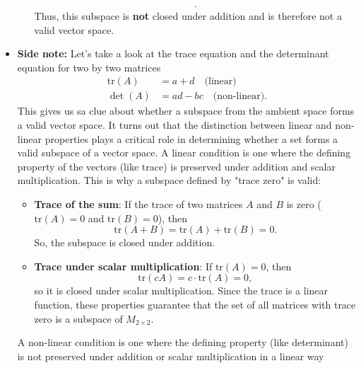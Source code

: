 \documentclass{report}
\begin{document}
\begin{itemize}
\begin{enumerate}
\begin{align*}
                    .\end{align*}
                    Thus, this subspace is \textbf{not} closed under addition and is therefore not a valid vector space.
            \end{enumerate}
        \item \textbf{Side note:} Let's take a look at the trace equation and the determinant equation for two by two matrices
            \begin{align*}
                \text{tr}(A) &= a + d \quad \text{(linear)} \\
                \det(A) &= ad - bc \quad \text{(non-linear)}
            .\end{align*}
            \bigbreak \noindent 
             This gives us sa clue about whether a subspace from the ambient space forms a valid vector space. It turns out that the distinction between linear and non-linear properties plays a critical role in determining whether a set forms a valid subspace of a vector space.
             \bigbreak \noindent 
             A linear condition is one where the defining property of the vectors (like trace) is preserved under addition and scalar multiplication. This is why a subspace defined by "trace zero" is valid:
             \begin{itemize}
                 \item \textbf{Trace of the sum}: If the trace of two matrices \( A \) and \( B \) is zero 
                 (\( \text{tr}(A) = 0 \) and \( \text{tr}(B) = 0 \)), then 
                 \[
                     \text{tr}(A + B) = \text{tr}(A) + \text{tr}(B) = 0.
                 \]
                 So, the subspace is closed under addition.
                 \bigbreak \noindent 
                 \item \textbf{Trace under scalar multiplication}: If \( \text{tr}(A) = 0 \), then 
                 \[
                     \text{tr}(cA) = c \cdot \text{tr}(A) = 0,
                 \]
                 so it is closed under scalar multiplication.
                 \bigbreak \noindent 
                 Since the trace is a linear function, these properties guarantee that the set of all matrices with trace zero is a subspace of \( M_{2 \times 2} \).
             \end{itemize}
             \bigbreak \noindent 
             A non-linear condition is one where the defining property (like determinant) is not preserved under addition or scalar multiplication in a linear way
             \begin{itemize}

\end{itemize}
\end{itemize}
\end{document}
